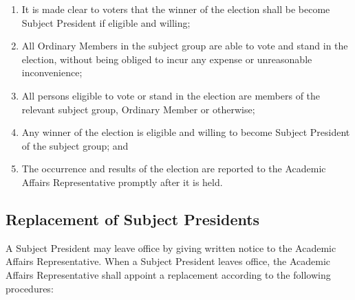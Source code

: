 \begin{enumerate}
    \item It is made clear to voters that the winner of the election shall be become Subject President if eligible and willing;
    \item All Ordinary Members in the subject group are able to vote and stand in the election, without being obliged to incur any expense or unreasonable inconvenience;
    \item All persons eligible to vote or stand in the election are members of the relevant subject group, Ordinary Member or otherwise;
    \item Any winner of the election is eligible and willing to become Subject President of the subject group; and
    \item The occurrence and results of the election are reported to the Academic Affairs Representative promptly after it is held.
\end{enumerate}
\subsection{Replacement of Subject Presidents} \label{ssec:roles_subjpres_replace}
A Subject President may leave office by giving written notice to the Academic Affairs Representative. When a Subject President leaves office, the Academic Affairs Representative shall appoint a replacement according to the following procedures:

